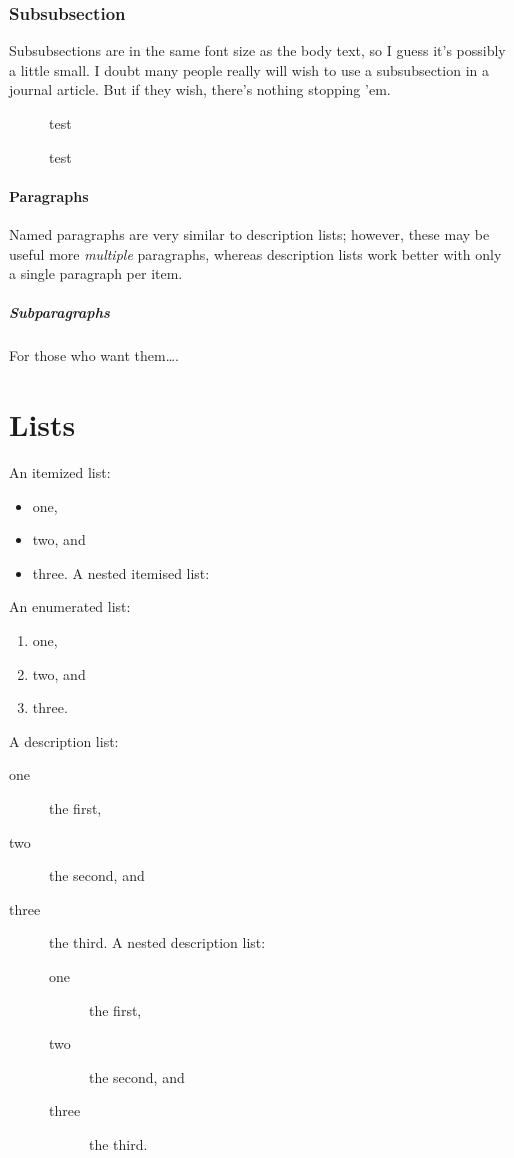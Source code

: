 \documentclass{pracjourn}
\begin{document}
\subsubsection{Subsubsection}


\upshape Subsubsections are in the same font size as the body text, so I guess
it's possibly a little small. I doubt many people really will wish to
use a subsubsection in a journal article. But if they wish, there's
nothing stopping 'em.


\begin{figure}[!ht]
	\centering test
	\caption{test}
\end{figure}

\paragraph{Paragraphs} Named paragraphs are very similar to description lists; however, these may be useful more \emph{multiple} paragraphs, whereas description lists work better with only a single paragraph per item.

\subparagraph{Subparagraphs} For those who want them\dots.

\section{Lists}
An itemized list:
\begin{itemize}
	\item one,
	\item two, and
	\item three.
	      A nested itemised list:
\end{itemize}
An enumerated list:
\begin{enumerate}
	\item one,
	\item two, and
	\item three.
\end{enumerate}
A description list:
\begin{description}
	\item [one] the first,
	\item [two] the second, and
	\item [three] the third. A nested description list:
	      \begin{description}
		      \item [one] the first,
		      \item [two] the second, and
		      \item [three] the third.
	      \end{description}
\end{description}
\end{document}
